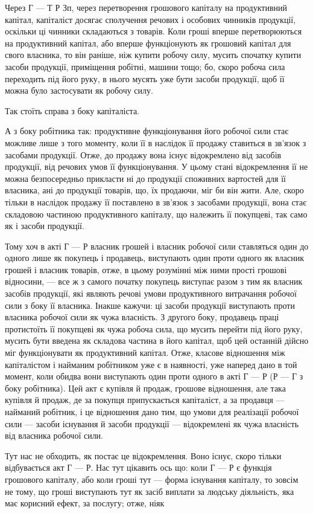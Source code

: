Через Г — Т  Р Зп, через перетворення грошового капіталу на
продуктивний капітал, капіталіст досягає сполучення речових і особових
чинників продукції, оскільки ці чинники складаються з товарів. Коли
гроші вперше перетворюються на продуктивний капітал, або вперше
функціонують як грошовий капітал для свого власника, то він раніше,
ніж купити робочу силу, мусить спочатку купити засоби продукції,
приміщення робітні, машини тощо; бо, скоро робоча сила переходить
під його руку, в нього мусять уже бути засоби продукції, щоб її можна
було застосувати як робочу силу.

Так стоїть справа з боку капіталіста.

А з боку робітника так: продуктивне функціонування його робочої
сили стає можливе лише з того моменту, коли її в наслідок її продажу
ставиться в зв’язок з засобами продукції. Отже, до продажу вона існує відокремлено
від засобів продукції, від речових умов її функціонування.
У цьому стані відокремлення її не можна безпосередньо прикласти ні до
продукції споживних вартостей для її власника, ані до продукції товарів,
що, їх продаючи, міг би він жити. Але, скоро тільки в наслідок продажу
її поставлено в зв'язок з засобами продукції, вона стає складовою
частиною продуктивного капіталу, що належить її покупцеві, так само як
і засоби продукції.

Тому хоч в акті Г — Р власник грошей і власник робочої сили
ставляться один до одного лише як покупець і продавець, виступають
один проти одного як власник грошей і власник товарів, отже, в цьому
розумінні між ними прості грошові відносини, — все ж з самого початку
покупець виступає разом з тим як власник засобів продукції, які являють
речові умови продуктивного витрачання робочої сили з боку її власника.
Інакше кажучи: ці засоби продукції виступають проти власника
робочої сили як чужа власність. З другого боку, продавець праці протистоїть
її покупцеві як чужа робоча сила, що мусить перейти під його
руку, мусить бути введена як складова частина в його капітал, щоб цей
останній дійсно міг функціонувати як продуктивний капітал. Отже, класове
відношення між капіталістом і найманим робітником уже є в наявності,
уже наперед дано в той момент, коли обидва вони виступають один
проти одного в акті Г — Р (Р — Г з боку робітника). Цей акт є купівля
й продаж, грошове відношення, але така купівля й продаж, де за покупця
припускається капіталіст, а за продавця — найманий робітник, і це відношення
дано тим, що умови для реалізації робочої сили — засоби існування
й засоби продукції — відокремлені як чужа власність від власника робочої
сили.

Тут нас не обходить, як постає це відокремлення. Воно існує, скоро
тільки відбувається акт Г — Р. Нас тут цікавить ось що: коли Г — Р є
функція грошового капіталу, або коли гроші тут — форма існування
капіталу, то зовсім не тому, що гроші виступають тут як засіб виплати
за людську діяльність, яка має корисний ефект, за послугу; отже, ніяк
\parbreak{}  %
